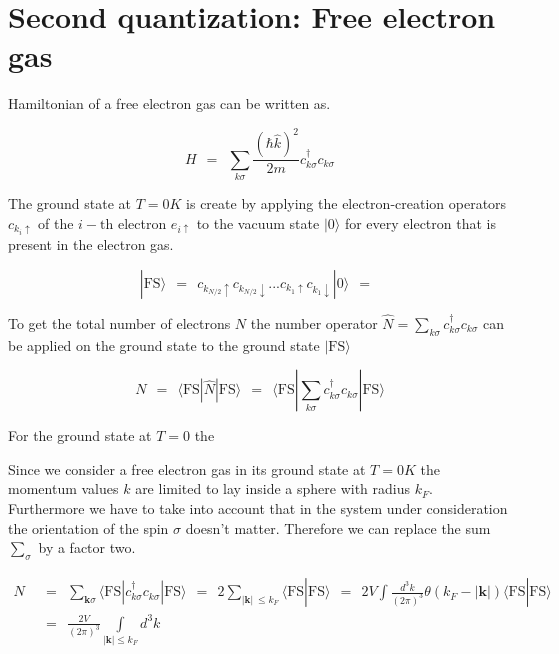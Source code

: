 \documentclass[10pt]{report}
\numberwithin{equation}{chapter}
\begin{document}
%

\section{Second quantization: Free electron gas} %

Hamiltonian of a free electron gas can be written as. 

\begin{equation}
  H ~~=~~ \sum_{k \sigma} \frac{(\hbar \hat{k})^2}{2m} c_{k \sigma}^\dag c_{k \sigma}
\end{equation}


The ground state at $T=0K$ is create by applying the electron-creation operators $c_{k_i \uparrow}$ of the $i-\text{th}$ electron $e_{i \uparrow}$ to the vacuum state $|0\rangle$ for every electron that is present in the electron gas. 

\begin{equation}
  | \text{FS} \rangle ~~=~~ c_{k_{N/2} \uparrow} c_{k_{N/2} \downarrow} ... c_{k_1 \uparrow} c_{k_1 \downarrow} | 0 \rangle ~~=~~   
\end{equation}

To get the total number of electrons $N$ the number operator $\hat{N} = \sum_{k \sigma} c_{k\sigma}^\dag c_{k\sigma}$ can be applied on the ground state to the ground state $| \text{FS} \rangle$

\begin{equation}\label{eq:number_operator}
  N ~~=~~ \langle \text{FS} | \hat{N} | \text{FS} \rangle 
    ~~=~~ \langle \text{FS} | \sum_{k\sigma} c_{k\sigma}^\dag c_{k\sigma} | \text{FS} \rangle
\end{equation} 


For the ground state at $T=0$ the 

Since we consider a free electron gas in its ground state at $T=0K$ the momentum values $k$ are limited to lay inside a sphere with radius $k_F$. Furthermore we have to take into account that in the system under consideration the orientation  of the spin $\sigma$ doesn't matter. Therefore we can replace the sum $\sum_\sigma$ by a factor two. 


\begin{align}
  N ~~& =~~ \sum_{\mathbf{k} \sigma} \langle \text{FS} | c_{k\sigma}^\dag c_{k\sigma} | \text{FS} \rangle ~~=~~ 2 \sum_{|\mathbf{k}|\ \leq k_F} \langle \text{FS} | \text{FS} \rangle
  ~~=~~ 2V \int \frac{d^3k}{(2\pi)^3} \theta(k_F - |\mathbf{k}|) \langle \text{FS} | \text{FS} \rangle \nonumber \\
  ~~& =~~ \frac{2V}{(2\pi)^3} \underset{|\mathbf{k}| \leq k_F}{\int} d^3k
\end{align}
\end{document}
